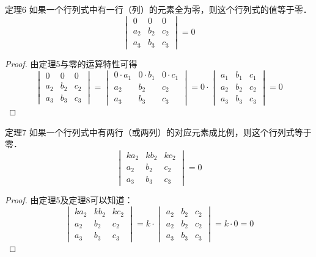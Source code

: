 \begin{blk}{定理6}
    如果一个行列式中有一行（列）的元素全为零，则这个行列式的值等于零．
    \[\begin{vmatrix}
        0&0&0\\a_2&b_2&c_2\\a_3&b_3&c_3
    \end{vmatrix}=0\]
\end{blk}

\begin{proof}
    由定理5与零的运算特性可得
\[\begin{vmatrix}
    0&0&0\\a_2&b_2&c_2\\a_3&b_3&c_3
\end{vmatrix}=\begin{vmatrix}
    0\cdot a_1&0\cdot b_1&0\cdot c_1\\a_2&b_2&c_2\\a_3&b_3&c_3
\end{vmatrix}=0\cdot\begin{vmatrix}
    a_1&b_1&c_1\\a_2&b_2&c_2\\a_3&b_3&c_3
\end{vmatrix}=0\]
\end{proof}

\begin{blk}{定理7}
    如果一个行列式中有两行（或两列）的对应元素成比例，则这个行列式等于零．
\[\begin{vmatrix}
    ka_2&kb_2&kc_2\\a_2&b_2&c_2\\a_3&b_3&c_3
\end{vmatrix}=0\]
\end{blk}

\begin{proof}
    由定理5及定理8可以知道：
    \[\begin{vmatrix}
        ka_2&kb_2&kc_2\\a_2&b_2&c_2\\a_3&b_3&c_3
    \end{vmatrix}=k\cdot\begin{vmatrix}
        a_2&b_2&c_2\\a_2&b_2&c_2\\a_3&b_3&c_3
    \end{vmatrix}=k\cdot 0=0\]
\end{proof}

